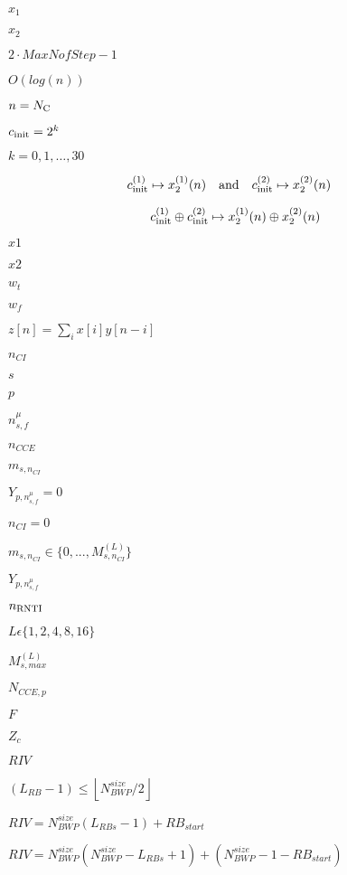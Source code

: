 \documentclass{article}
\begin{document}
$x_1$
\pagebreak

$x_2$
\pagebreak

$2\cdot MaxNofStep - 1$
\pagebreak

$O(log(n))$
\pagebreak

$n = N_{\textup{C}}$
\pagebreak

$c_{\textup{init}} = 2^k$
\pagebreak

$k=0,1,\dots,30$
\pagebreak

\begin{align*} c_{\textup{init}}^{(1)} &\mapsto x_2^{(1)}(n) &&\text{and} &
c_{\textup{init}}^{(2)} &\mapsto x_2^{(2)}(n)
\end{align*}
\pagebreak

\[
c_{\textup{init}}^{(1)} \oplus c_{\textup{init}}^{(2)} \mapsto x_2^{(1)}(n) \oplus x_2^{(2)}(n)
\]
\pagebreak

$x1$
\pagebreak

$x2$
\pagebreak

$w_t$
\pagebreak

$w_f$
\pagebreak

$z[n] = \sum_{i} x[i] y[n-i]$
\pagebreak

$n_{CI}$
\pagebreak

$s$
\pagebreak

$p$
\pagebreak

$n_{s,f}^\mu$
\pagebreak

$n_{CCE}$
\pagebreak

$m_{s,n_{CI}}$
\pagebreak

$Y_{p,n_{s,f}^\mu}=0$
\pagebreak

$n_{CI}=0$
\pagebreak

$m_{s,n_{CI}}\in \{0,...,M_{s,n_{CI}}^{(L)}\}$
\pagebreak

$Y_{p,n_{s,f}^\mu}$
\pagebreak

$n_\textup{RNTI}$
\pagebreak

$L\epsilon\{1,2,4,8,16\}$
\pagebreak

$M_{s,max}^{(L)}$
\pagebreak

$N_{CCE,p}$
\pagebreak

$F$
\pagebreak

$Z_c$
\pagebreak

$RIV$
\pagebreak

$(L_{RB} - 1) \leq \left \lfloor N_{BWP}^{size}/2 \right \rfloor$
\pagebreak

$RIV = N_{BWP}^{size}(L_{RBs}-1)+RB_{start}$
\pagebreak

$RIV = N_{BWP}^{size}(N_{BWP}^{size}-L_{RBs}+1)+(N_{BWP}^{size}-1-RB_{start})$
\pagebreak
\end{document}
